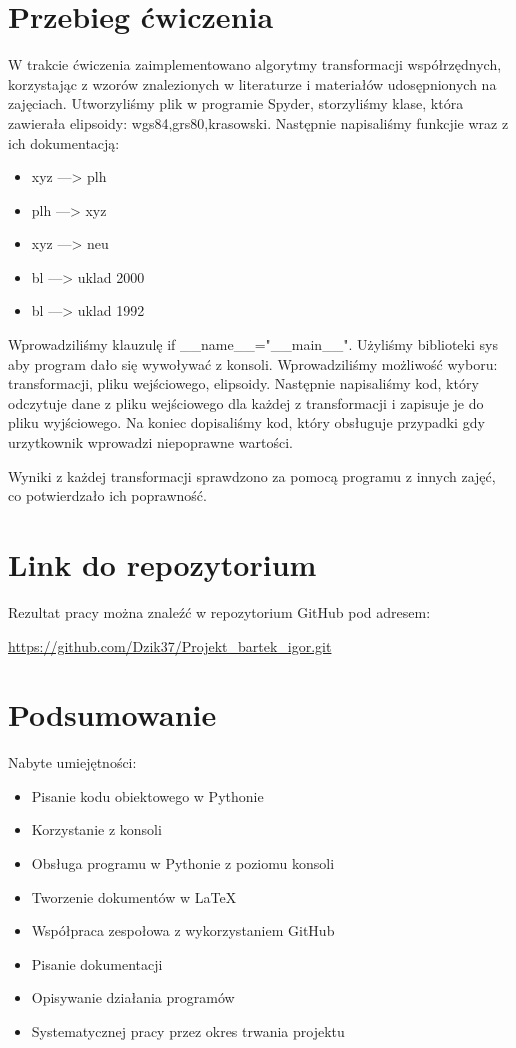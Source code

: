\documentclass[11pt, a4paper]{article}
\begin{document}
	\section{Przebieg ćwiczenia}
	W trakcie ćwiczenia zaimplementowano algorytmy transformacji współrzędnych, korzystając z wzorów znalezionych w literaturze i materiałów udosępnionych na zajęciach. Utworzyliśmy plik w programie Spyder, storzyliśmy klase, która zawierała elipsoidy: wgs84,grs80,krasowski. Następnie napisaliśmy funkcjie wraz z ich dokumentacją:
	\begin{itemize}
		\item xyz ---> plh
		\item plh ---> xyz
		\item xyz ---> neu
		\item bl ---> uklad 2000
		\item bl ---> uklad 1992
		
	\end{itemize} 
	 Wprowadziliśmy klauzulę if \_\_name\_\_="\_\_main\_\_".
	 Użyliśmy biblioteki sys aby program dało się wywoływać z konsoli. Wprowadziliśmy możliwość wyboru: transformacji, pliku wejściowego, elipsoidy.
	 Następnie napisaliśmy kod, który odczytuje dane z pliku wejściowego dla każdej z transformacji i zapisuje je do pliku wyjściowego. Na koniec dopisaliśmy kod, który obsługuje przypadki gdy urzytkownik wprowadzi niepoprawne wartości.
	 
	 Wyniki z każdej transformacji sprawdzono za pomocą programu z innych zajęć, co potwierdzało ich poprawność.
	
	\section{Link do repozytorium}
	Rezultat pracy można znaleźć w repozytorium GitHub pod adresem:
	
	 \url{https://github.com/Dzik37/Projekt_bartek_igor.git}
	
	\section{Podsumowanie}
	Nabyte umiejętności:
	\begin{itemize}
		\item Pisanie kodu obiektowego w Pythonie
		\item Korzystanie z konsoli 
		\item Obsługa programu w Pythonie z poziomu konsoli
		\item Tworzenie dokumentów w LaTeX
		\item Współpraca zespołowa z wykorzystaniem GitHub
		\item Pisanie dokumentacji
		\item Opisywanie działania programów 
		\item Systematycznej pracy przez okres trwania projektu
	\end{itemize}
	
\end{document}
